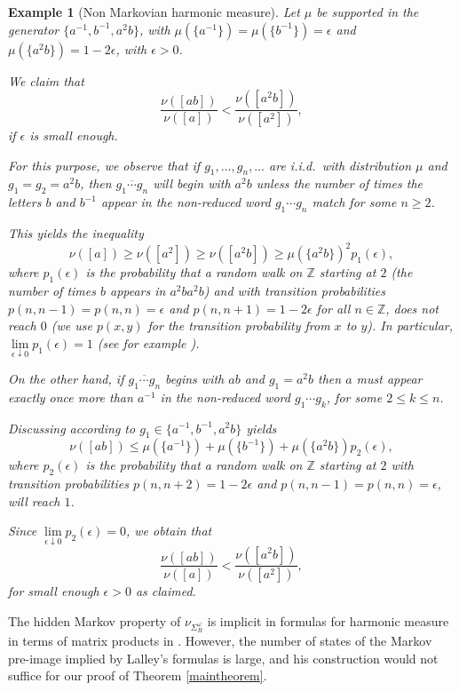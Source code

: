 \documentclass{article}
\newtheorem{example}{Example}
\newcommand{\Z}{\mathbb{Z}}
\begin{document}
\begin{example}[Non Markovian harmonic measure]\label{example:non-Markovian}
    Let \(\mu\) be supported in the generator \(\{a^{-1},b^{-1},a^2b\}\), with \(\mu(\lbrace a^{-1}\rbrace) = \mu(\lbrace b^{-1}\rbrace) = \epsilon\) and \(\mu(\lbrace a^2b\rbrace) = 1-2\epsilon\), with \(\epsilon > 0\).

    We claim that
    \[\frac{\nu([ab])}{\nu([a])} < \frac{\nu([a^2b])}{\nu([a^2])},\]
    if \(\epsilon\) is small enough.

    For this purpose, we observe that if \(g_1,\ldots,g_n,\ldots\) are i.i.d.\ with distribution \(\mu\) and \(g_1 = g_2 = a^2b\), then \(\overline{g_1\cdots g_n}\) will begin with \(a^2b\) unless the number of times the letters \(b\) and \(b^{-1}\) appear in the non-reduced word \(g_1\cdots g_n\) match for some $n\geq 2$.

    This yields the inequality
    \[\nu([a]) \ge \nu([a^2]) \ge \nu([a^2b]) \ge \mu(\lbrace a^2b\rbrace)^2 p_1(\epsilon),\]
    where \(p_1(\epsilon)\) is the probability that a random walk on \(\Z\) starting at \(2\) (the number of times \(b\) appears in \(a^2ba^2b\)) and with transition probabilities \(p(n,n-1) = p(n,n) = \epsilon\) and \(p(n,n+1) = 1-2\epsilon\) for all \(n \in \Z\), does not reach \(0\) (we use \(p(x,y)\) for the transition probability from \(x\) to \(y\)).  In particular, \(\lim\limits_{\epsilon \downarrow 0}p_1(\epsilon) = 1\) (see for example \cite[Chapter IV.19]{spitzer}).

    On the other hand, if $\overline{g_1\cdots g_n}$ begins with \(ab\) and \(g_1 = a^2b\) then \(a\) must appear exactly once more than \(a^{-1}\) in the non-reduced word \(g_1\cdots g_k\), for some $2\leq k\leq n$.
    
    Discussing according to $g_1\in\{a^{-1},b^{-1},a^{2}b\}$ yields
    \[\nu([ab]) \le \mu(\lbrace a^{-1}\rbrace) + \mu(\lbrace b^{-1}\rbrace) + \mu(\lbrace a^2b\rbrace)p_2(\epsilon),\]
    where \(p_2(\epsilon)\) is the probability that a random walk on \(\Z\) starting at \(2\) with transition probabilities \(p(n,n+2) = 1-2\epsilon\) and \(p(n,n-1) = p(n,n) = \epsilon\), will reach \(1\).   
    
    Since \(\lim\limits_{\epsilon \downarrow 0}p_2(\epsilon) = 0\), we obtain that
    \[\frac{\nu([ab])}{\nu([a])} < \frac{\nu([a^2b])}{\nu([a^2])},\]
    for small enough \(\epsilon > 0\) as claimed.
\end{example}

The hidden Markov property of \(\nu_{\Sigma^\omega_R}\) is implicit in formulas for harmonic measure in terms of matrix products in \cite{lalley}.  However, the number of states of the Markov pre-image implied by Lalley's formulas is large, and his construction would not suffice for our proof of Theorem \ref{maintheorem}.
\end{document}
